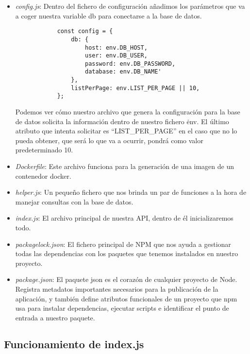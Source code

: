 \begin{itemize}
\begin{itemize}
              \item \textit{config.js}: Dentro del fichero de configuración añadimos los parámetros que va a coger nuestra variable db para conectarse a la base de datos.
                    \begin{verbatim}
            const config = {
                db: {
                    host: env.DB_HOST,
                    user: env.DB_USER,
                    password: env.DB_PASSWORD,
                    database: env.DB_NAME'
                },
                listPerPage: env.LIST_PER_PAGE || 10,
            };
        \end{verbatim}
                    \begin{tcolorbox}
                        [colback=green!5!white,colframe=green!75!black,fonttitle=\bfseries,title=Utilización del archivo .env]
                        Podemos ver cómo nuestro archivo que genera la configuración para la base de datos solicita la información dentro de nuestro fichero \.env. El último atributo que intenta solicitar es ``LIST\_PER\_PAGE'' en el caso que no lo pueda obtener, que será lo que va a ocurrir, pondrá como valor predeterminado 10.
                    \end{tcolorbox}
              \item \textit{Dockerfile}: Este archivo funciona para la generación de una imagen de un contenedor docker.
              \item \textit{helper.js}: Un pequeño fichero que nos brinda un par de funciones a la hora de manejar consultas con la base de datos.
              \item \textit{index.js}: El archivo principal de nuestra API, dentro de él inicializaremos todo.
              \item \textit{package\-lock.json}: El fichero principal de NPM que nos ayuda a gestionar todas las dependencias con los paquetes que tenemos instalados en nuestro proyecto.
              \item \textit{package.json}: El paquete json es el corazón de cualquier proyecto de Node. Registra metadatos importantes necesarios para la publicación de la aplicación, y también define atributos funcionales de un proyecto que npm usa para instalar dependencias, ejecutar scripts e identificar el punto de entrada a nuestro paquete.
          \end{itemize}
\end{itemize}

\subsection{Funcionamiento de index.js}

